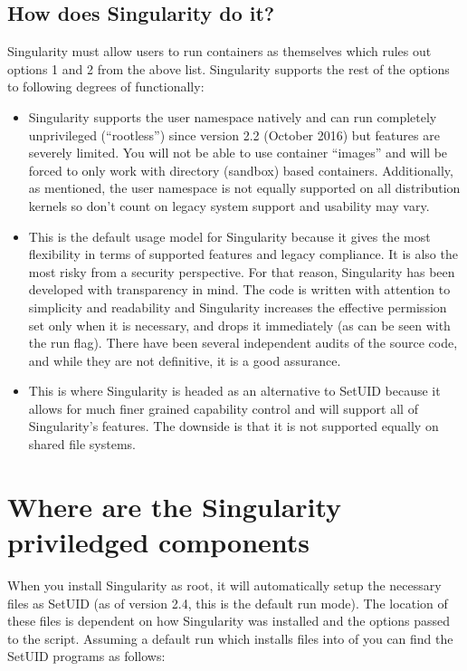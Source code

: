 \documentclass[letterpaper,10pt,english]{sphinxmanual}
\begin{document}
\subsection{How does Singularity do it?}
\label{\detokenize{security:how-does-singularity-do-it}}
Singularity must allow users to run containers as themselves which rules
out options 1 and 2 from the above list. Singularity supports the rest
of the options to following degrees of functionally:
\begin{itemize}
\item {} 
 Singularity supports the user namespace natively
and can run completely unprivileged (“rootless”) since version 2.2
(October 2016) but features are severely limited. You will not be
able to use container “images” and will be forced to only work with
directory (sandbox) based containers. Additionally, as mentioned, the
user namespace is not equally supported on all distribution kernels
so don’t count on legacy system support and usability may vary.

\item {} 
 This is the default usage model for Singularity because
it gives the most flexibility in terms of supported features and
legacy compliance. It is also the most risky from a security
perspective. For that reason, Singularity has been developed with
transparency in mind. The code is written with attention to
simplicity and readability and Singularity increases the effective
permission set only when it is necessary, and drops it immediately
(as can be seen with the  run flag). There have been several
independent audits of the source code, and while they are not
definitive, it is a good assurance.

\item {} 
 This is where Singularity is headed as an
alternative to SetUID because it allows for much finer grained
capability control and will support all of Singularity’s features.
The downside is that it is not supported equally on shared file
systems.

\end{itemize}


\section{Where are the Singularity priviledged components}
\label{\detokenize{security:where-are-the-singularity-priviledged-components}}
When you install Singularity as root, it will automatically setup the
necessary files as SetUID (as of version 2.4, this is the default run
mode). The location of these files is dependent on how Singularity was
installed and the options passed to the  script. Assuming a default  run
which installs files into  of  you can find the SetUID programs as
follows:
\end{document}
